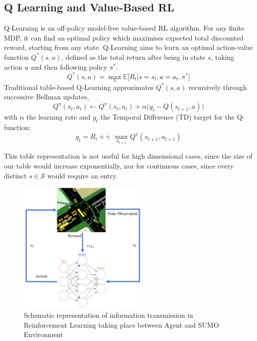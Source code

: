 \documentclass[conference]{IEEEtran}
\begin{document}
\subsection{Q Learning and Value-Based RL}
Q-Learning\cite{watkins} is an off-policy model-free value-based RL algorithm. For any finite MDP, it can find an optimal policy which maximises expected total discounted reward, starting from any state\cite{melo}.
Q-Learning aims to learn an optimal action-value function $Q^*(s,a)$, defined as the total return after being in state $s$, taking action $a$ and then following policy $\pi^*$. %
\begin{equation}
Q^*(s,a) = \max_{\pi} \mathbb{E} \big[ R_t | s=s_t, a=a_t, \pi^* \big]
\label{eq:qlearning}
\end{equation}
Traditional table-based Q-Learning approximates $Q^*(s,a)$ recursively through successive Bellman updates,
\begin{equation}
Q^{\pi}(s_t,a_t) \leftarrow Q^{\pi}(s_t,a_t) + \alpha \big( y_t - Q(s_{t+1},a) \big)
\label{eq:bellmanupdate}
\end{equation}
with $\alpha$ the learning rate and $y_t$ the Temporal Difference (TD) target for the Q-function:
\begin{equation}
y_t = R_t + \gamma \,\,\, \max_{a_{t+1}} Q^{\pi}(s_{t+1},a_{t+1})
\end{equation}

This table representation is not useful for high dimensional cases, since the size of our table would increase exponentially, nor for continuous cases, since every distinct $s\in\mathcal{S}$ would require an entry.

\begin{figure}                                                
\centering                                                    
\includegraphics[width=2.5in]{schematic_pp2.png}                                    
\caption{Schematic representation of information transmission in Reinforcement Learning taking place between Agent and SUMO Environment}                                  
\label{rl}                                               
\end{figure}  
\end{document}
